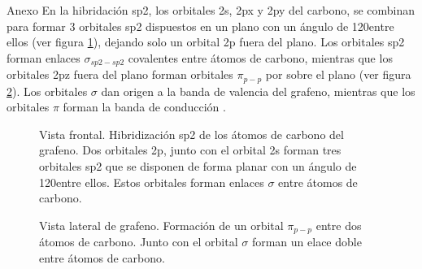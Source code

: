\documentclass[aspectratio=169]{beamer}
\begin{document}
	\begin{frame}[allowframebreaks]{Anexo}
		En la hibridación sp2, los orbitales 2s, 2px y 2py del carbono, se combinan para formar 3 orbitales sp2 dispuestos en un plano con un ángulo de 120\degree entre ellos (ver figura \ref{fig:sp2_hybrid}), dejando solo un orbital 2p fuera del plano. Los orbitales sp2 forman enlaces $\sigma_{sp2-sp2}$ covalentes entre átomos de carbono, mientras que los orbitales 2pz fuera del plano forman orbitales $\pi_{p-p}$ por sobre el plano (ver figura \ref{fig:pi_orbitals}). Los orbitales $\sigma$ dan origen a la banda de valencia del grafeno, mientras que los orbitales $\pi$ forman la banda de conducción \citep{CastroNeto2009}.
		
		\begin{figure}[h!]
			\centering
			\caption[Hibridización sp2]{Vista frontal. Hibridización sp2 de los átomos de carbono del grafeno. Dos orbitales 2p, junto con el orbital 2s forman tres orbitales sp2 que se disponen de forma planar con un ángulo de 120\degree entre ellos. Estos orbitales forman enlaces $\sigma$ entre átomos de carbono.}
			\label{fig:sp2_hybrid}
		\end{figure}
		
		\begin{figure}[h!]
			\centering
			\caption[Formación de un orbital $\pi$]{Vista lateral de grafeno. Formación de un orbital $\pi_{p-p}$ entre dos átomos de carbono. Junto con el orbital $\sigma$ forman un elace doble entre átomos de carbono.}
			\label{fig:pi_orbitals}
		\end{figure}
	\end{frame}
\end{document}

